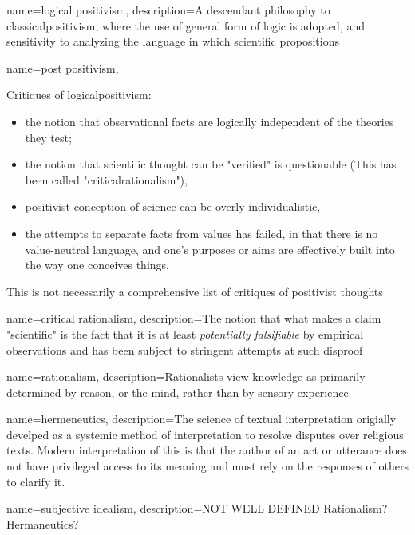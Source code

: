 {
	name={logical positivism},
	description={A descendant philosophy to \gls{classicalpositivism}, where the use of general form of logic is adopted, and sensitivity to analyzing the language in which scientific propositions \parencite{bredo_philosophies_2006}}
}


{
	name={post positivism},
}
{Critiques of \gls{logicalpositivism}:
\begin{itemize}
\item the notion that observational facts are logically independent of the theories they test;
\item the notion that scientific thought can be "verified" is questionable (This has been called "\gls{criticalrationalism}"),
\item positivist conception of science can be overly individualistic, 
\item the attempts to separate facts from values has failed, in that there is no value-neutral language, and one's purposes or aims are effectively built into the way one conceives things.
\end{itemize}
This is not necessarily a comprehensive list of critiques of positivist thoughts \parencite{bredo_philosophies_2006}
}


{
	name={critical rationalism},
	description={The notion that what makes a claim "scientific" is the fact that it is at least \emph{potentially falsifiable} by empirical observations and has been subject to stringent attempts at such disproof \parencite{bredo_philosophies_2006}}	
}

{
	name=rationalism,
	description={Rationalists view knowledge as primarily determined by reason, or the mind, rather than by sensory experience}
}


{
	name={hermeneutics},
	description={The science of textual interpretation origially develped as a systemic method of interpretation to resolve disputes over religious texts. Modern interpretation of this is that the author of an act or utterance does not have privileged access to its meaning and must rely on the responses of others to clarify it.  \parencite{bredo_philosophies_2006}}
}


{
	name={subjective idealism},
	description={NOT WELL DEFINED Rationalism? Hermaneutics? \parencite{bredo_philosophies_2006}}
}


